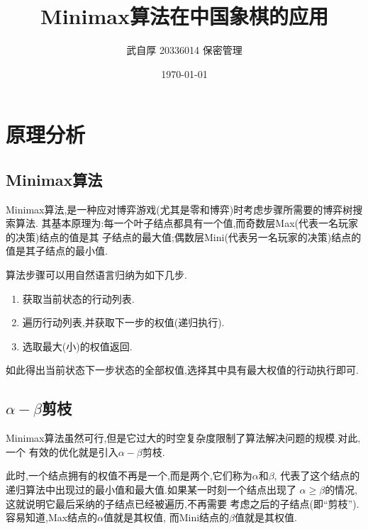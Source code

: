 
\geometry{a4paper}
\title{Minimax算法在中国象棋的应用}
\author{武自厚 20336014 保密管理}
\date{\today}

\newcommand{\code}[1]{\texttt{#1}}
\newcommand{\true}[0]{\textbf{\emph{true}}}
\newcommand{\false}[0]{\textbf{\emph{false}}}
\newcommand{\img}[3]{\begin{figure}[H]
    \centering
    \texttt{[image: \#2]}
\end{figure}}


    \maketitle

    \section{原理分析}

    \subsection{Minimax算法}

    Minimax算法,是一种应对博弈游戏(尤其是零和博弈)时考虑步骤所需要的博弈树搜索算法.
    其基本原理为:每一个叶子结点都具有一个值,而奇数层Max(代表一名玩家的决策)结点的值是其
    子结点的最大值;偶数层Mini(代表另一名玩家的决策)结点的值是其子结点的最小值.

    算法步骤可以用自然语言归纳为如下几步.

    \begin{enumerate}
        \item 获取当前状态的行动列表.
        \item 遍历行动列表,并获取下一步的权值(递归执行).
        \item 选取最大(小)的权值返回.
    \end{enumerate}

    如此得出当前状态下一步状态的全部权值,选择其中具有最大权值的行动执行即可.

    \subsection{\(\alpha-\beta\)剪枝}

    Minimax算法虽然可行,但是它过大的时空复杂度限制了算法解决问题的规模.对此,一个
    有效的优化就是引入\(\alpha-\beta\)剪枝.

    此时,一个结点拥有的权值不再是一个,而是两个,它们称为\(\alpha\)和\(\beta\),
    代表了这个结点的递归算法中出现过的最小值和最大值.如果某一时刻一个结点出现了
    \(\alpha \ge \beta\)的情况,这就说明它最后采纳的子结点已经被遍历,不再需要
    考虑之后的子结点(即``剪枝'').容易知道,Max结点的\(\alpha\)值就是其权值,
    而Mini结点的\(\beta\)值就是其权值.

